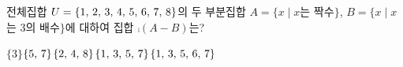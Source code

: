 전체집합 $U=\{1,\mkern3mu 2,\mkern3mu 3,\mkern3mu 4,\mkern3mu 5,\mkern3mu 6,\mkern3mu 7,\mkern3mu 8\}$의 두 부분집합 $A=\{x \mid x$는 짝수$\}$, $B=\{x \mid x$는 $3$의 배수$\}$에 대하여 집합 $\comp{(A-B)}$는?
\begin{choicesii}{$\{3\}$}{$\{5,\mkern3mu 7\}$}{$\{2,\mkern3mu 4,\mkern3mu 8\}$}{$\{1,\mkern3mu 3,\mkern3mu 5,\mkern3mu 7\}$}{$\{1,\mkern3mu 3,\mkern3mu 5,\mkern3mu 6,\mkern3mu 7\}$}\end{choicesii}
